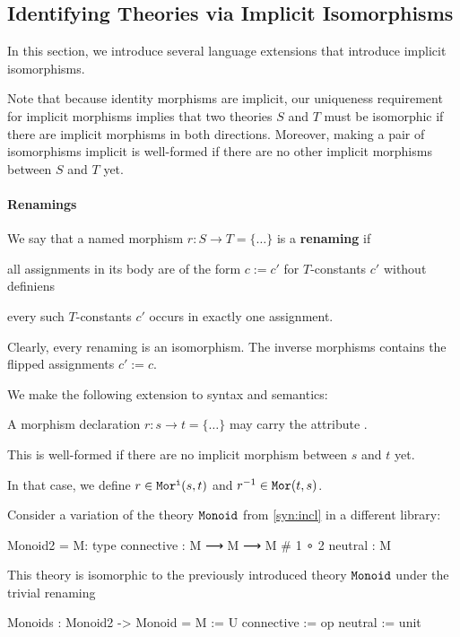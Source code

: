 \subsection{Identifying Theories via Implicit Isomorphisms}\label{sec:inverse}

In this section, we introduce several language extensions that introduce implicit isomorphisms.

Note that because identity morphisms are implicit, our uniqueness requirement for implicit morphisms implies that two theories $S$ and $T$ must be isomorphic if there are implicit morphisms in both directions.
Moreover, making a pair of isomorphisms implicit is well-formed if there are no other implicit morphisms between $S$ and $T$ yet.

\paragraph{Renamings}
We say that a named morphism $r:S\to T=\{\ldots\}$ is a \textbf{renaming} if
\begin{compactitem}
 \item all assignments in its body are of the form $c:=c'$ for $T$-constants $c'$ without definiens
 \item every such $T$-constants $c'$ occurs in exactly one assignment.
\end{compactitem}
Clearly, every renaming is an isomorphism.
The inverse morphisms contains the flipped assignments $c':=c$.

We make the following extension to syntax and semantics:
\begin{compactitem}
  \item A morphism declaration $r:s\to t=\{\ldots\}$ may carry the attribute .
  \item This is well-formed if there are no implicit morphism between $s$ and $t$ yet.
  \item In that case, we define $r\in\mathtt{Mor^i}(s,t)$ and $r^{-1}\in\mathtt{Mor}(t,s)$.
\end{compactitem}

\begin{example}
	Consider a variation of the theory $\operatorname{\mathtt{Monoid}}$ from \autoref{syn:incl} in a different library:
	\begin{mmtcode}
Monoid2 =
  M: type
  connective : M ⟶ M ⟶ M	 # 1 ∘ 2 
  neutral	: M
\end{mmtcode}
This theory is isomorphic to the previously introduced theory $\operatorname{\mathtt{Monoid}}$ under the trivial renaming
	\begin{mmtcode}
Monoids : Monoid2 -> Monoid =
  M 		:= U
  connective 	:= op 
  neutral	:= unit
\end{mmtcode}
\end{example}

